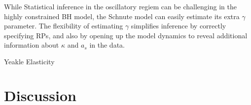 %
While Statistical inference in the oscillatory regiem can be challenging in
the highly constrained BH model, the Schnute model can easily estimate its extra
$\gamma$ parameter. The flexibility of estimating $\gamma$ simplifies inference by 
correctly specifying RPs, and also by opening up the model dynamics to reveal
additional information about $\kappa$ and $a_s$ in the data. %

{\color{red} Yeakle Elasticity \cite{yeakel_generalized_2015}}


%
\clearpage
\section{Discussion}

